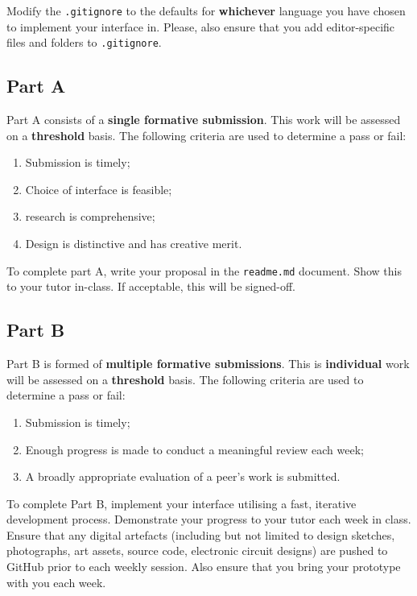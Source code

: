 \documentclass{../../fal_assignment}
\begin{document}
Modify the \texttt{.gitignore} to the defaults for \textbf{whichever} language you have chosen to implement your interface in. Please, also ensure that you add editor-specific files and folders to \texttt{.gitignore}. 

\subsection*{Part A}

Part A consists of a \textbf{single formative submission}. This work will be assessed on a \textbf{threshold} basis. The following criteria are used to determine a pass or fail:

\begin{enumerate}[label=(\alph*)]
	\item Submission is timely;
	\item Choice of interface is feasible;
	\item research is comprehensive;
	\item Design is distinctive and has creative merit.
\end{enumerate}

To complete part A, write your proposal in the \texttt{readme.md} document. Show this to your tutor in-class. If acceptable, this will be signed-off.

\subsection*{Part B}

Part B is formed of \textbf{multiple formative submissions}. This is \textbf{individual} work will be assessed on a \textbf{threshold} basis. The following criteria are used to determine a pass or fail:

\begin{enumerate}[label=(\alph*)]
	\item Submission is timely;
	\item Enough progress is made to conduct a meaningful review each week;
	\item A broadly appropriate evaluation of a peer's work is submitted.
\end{enumerate}

To complete Part B, implement your interface utilising a fast, iterative development process. Demonstrate your progress to your tutor each week in class. Ensure that any digital artefacts (including but not limited to design sketches, photographs, art assets, source code, electronic circuit designs) are pushed to GitHub prior to each weekly session. Also ensure that you bring your prototype with you each week. 
\end{document}
